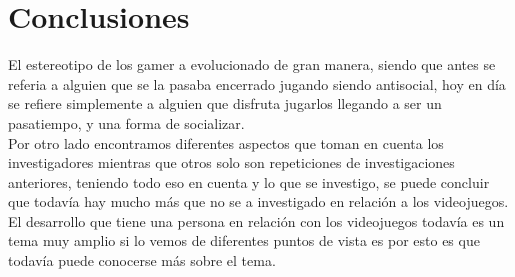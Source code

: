 \documentclass{bmcart}
\begin{document}
\section*{Conclusiones}


\begin{backmatter}

El estereotipo de los gamer a evolucionado de gran manera, siendo que antes se referia a alguien que se la pasaba encerrado jugando siendo antisocial, hoy en día se refiere simplemente a alguien que disfruta jugarlos llegando a ser un pasatiempo, y una forma de socializar.\\
Por otro lado encontramos diferentes aspectos que toman en cuenta los investigadores mientras que otros solo son repeticiones de investigaciones anteriores, teniendo todo eso en cuenta y lo que se investigo, se puede concluir que todavía hay mucho más que no se a investigado en relación a los videojuegos.\\
El desarrollo que tiene una persona en relación con los videojuegos todavía es un tema muy amplio si lo vemos de diferentes puntos de vista es por esto es que todavía puede conocerse más sobre el tema.






\end{backmatter}
\end{document}
